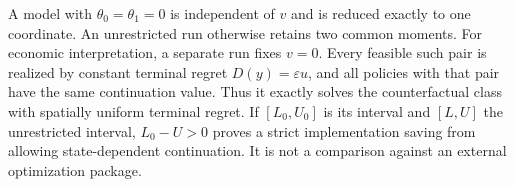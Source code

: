 A model with $\theta_0=\theta_1=0$ is independent of $v$ and is reduced exactly to one coordinate. An unrestricted run otherwise retains two common moments. For economic interpretation, a separate run fixes $v=0$. Every feasible such pair is realized by constant terminal regret $D(y)=\varepsilon u$, and all policies with that pair have the same continuation value. Thus it exactly solves the counterfactual class with spatially uniform terminal regret. If $[L_0,U_0]$ is its interval and $[L,U]$ the unrestricted interval, $L_0-U>0$ proves a strict implementation saving from allowing state-dependent continuation. It is not a comparison against an external optimization package.

